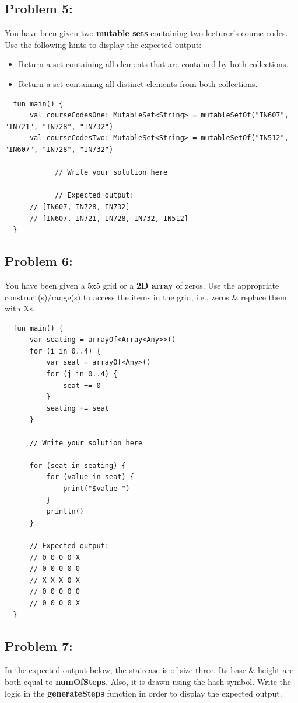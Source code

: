 \documentclass{article}
\begin{document}
\subsection*{Problem 5:} You have been given two \textbf{mutable sets} containing two lecturer's course codes. Use the following hints to display the expected output:
\begin{itemize}
  \item Return a set containing all elements that are contained by both collections. 
  \item Return a set containing all distinct elements from both collections.
\end{itemize}

\begin{verbatim}
  fun main() {
      val courseCodesOne: MutableSet<String> = mutableSetOf("IN607", "IN721", "IN728", "IN732")
      val courseCodesTwo: MutableSet<String> = mutableSetOf("IN512", "IN607", "IN728", "IN732")
      
			// Write your solution here
      
			// Expected output:
      // [IN607, IN728, IN732]
      // [IN607, IN721, IN728, IN732, IN512] 
  }
\end{verbatim}

\subsection*{Problem 6:}
You have been given a 5x5 grid or a \textbf{2D array} of zeros. Use the appropriate construct(s)/range(s) to access the items in the grid, i.e., zeros \& replace them with Xs.

\begin{verbatim}
  fun main() {
      var seating = arrayOf<Array<Any>>()
      for (i in 0..4) {
          var seat = arrayOf<Any>()
          for (j in 0..4) {
              seat += 0
          }
          seating += seat
      }

      // Write your solution here

      for (seat in seating) {
          for (value in seat) {
              print("$value ")
          }
          println()
      }

      // Expected output:
      // 0 0 0 0 X 
      // 0 0 0 0 0 
      // X X X 0 X 
      // 0 0 0 0 0 
      // 0 0 0 0 X
  }
\end{verbatim}

\subsection*{Problem 7:}
In the expected output below, the staircase is of size three. Its base \& height are both equal to \textbf{numOfSteps}. Also, it is drawn using the hash symbol. Write the logic in the \textbf{generateSteps} function in order to display the expected output.
\end{document}
